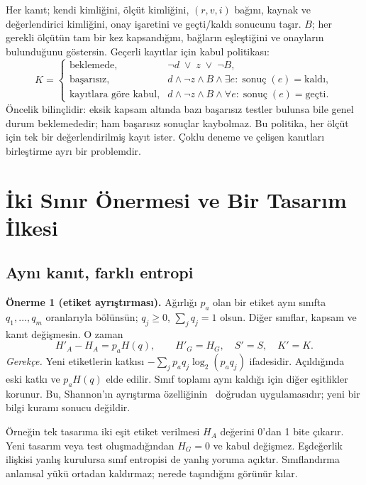 \documentclass[runningheads]{llncs}
\begin{document}
Her kanıt; kendi kimliğini, ölçüt kimliğini, $(r,v,i)$ bağını, kaynak ve değerlendirici kimliğini, onay işaretini ve geçti/kaldı sonucunu taşır. $B$; her gerekli ölçütün tam bir kez kapsandığını, bağların eşleştiğini ve onayların bulunduğunu göstersin. Geçerli kayıtlar için kabul politikası:
\begin{equation}
K=\begin{cases}
\text{beklemede},&\neg d\;\lor\;z\;\lor\;\neg B,\\
\text{başarısız},&d\land\neg z\land B\land\exists e:\operatorname{sonuç}(e)=\text{kaldı},\\
\text{kayıtlara göre kabul},&d\land\neg z\land B\land\forall e:\operatorname{sonuç}(e)=\text{geçti}.
\end{cases}
\end{equation}
Öncelik bilinçlidir: eksik kapsam altında bazı başarısız testler bulunsa bile genel durum beklemededir; ham başarısız sonuçlar kaybolmaz. Bu politika, her ölçüt için tek bir değerlendirilmiş kayıt ister. Çoklu deneme ve çelişen kanıtları birleştirme ayrı bir problemdir.

\section{İki Sınır Önermesi ve Bir Tasarım İlkesi}
\subsection{Aynı kanıt, farklı entropi}
\textbf{Önerme 1 (etiket ayrıştırması).} Ağırlığı $p_a$ olan bir etiket aynı sınıfta $q_1,\ldots,q_m$ oranlarıyla bölünsün; $q_j\geq0$, $\sum_jq_j=1$ olsun. Diğer sınıflar, kapsam ve kanıt değişmesin. O zaman
\begin{equation}
H'_A-H_A=p_aH(q),\qquad H'_G=H_G,\quad S'=S,\quad K'=K.
\end{equation}
\textit{Gerekçe.} Yeni etiketlerin katkısı $-\sum_jp_aq_j\log_2(p_aq_j)$ ifadesidir. Açıldığında eski katkı ve $p_aH(q)$ elde edilir. Sınıf toplamı aynı kaldığı için diğer eşitlikler korunur. Bu, Shannon'ın ayrıştırma özelliğinin~\cite{shannon} doğrudan uygulamasıdır; yeni bir bilgi kuramı sonucu değildir.

Örneğin tek tasarıma iki eşit etiket verilmesi $H_A$ değerini 0'dan 1 bite çıkarır. Yeni tasarım veya test oluşmadığından $H_G=0$ ve kabul değişmez. Eşdeğerlik ilişkisi yanlış kurulursa sınıf entropisi de yanlış yoruma açıktır. Sınıflandırma anlamsal yükü ortadan kaldırmaz; nerede taşındığını görünür kılar.
\end{document}
